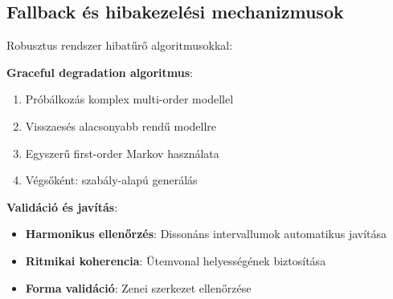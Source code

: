 \subsection{Fallback és hibakezelési mechanizmusok}
Robusztus rendszer hibatűrő algoritmusokkal:

\textbf{Graceful degradation algoritmus}:
\begin{enumerate}
\item Próbálkozás komplex multi-order modellel
\item Visszaesés alacsonyabb rendű modellre
\item Egyszerű first-order Markov használata
\item Végsőként: szabály-alapú generálás
\end{enumerate}

\textbf{Validáció és javítás}:
\begin{itemize}
\item \textbf{Harmonikus ellenőrzés}: Dissonáns intervallumok automatikus javítása
\item \textbf{Ritmikai koherencia}: Ütemvonal helyességének biztosítása
\item \textbf{Forma validáció}: Zenei szerkezet ellenőrzése
\end{itemize}